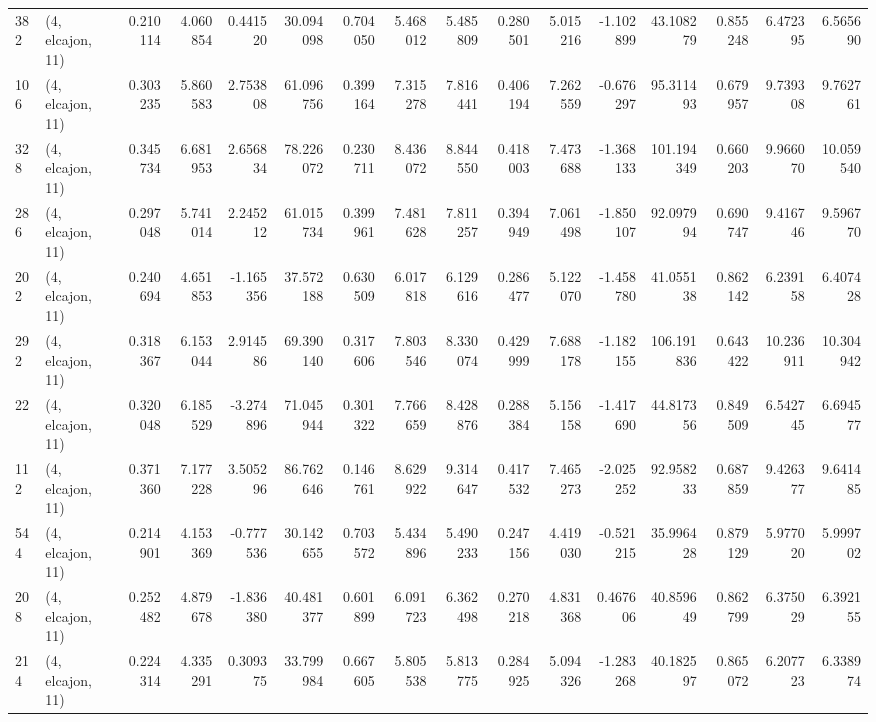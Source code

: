 \begin{tabular}{llrrrrrrrrrrrrrr}
382 &  (4, elcajon, 11) &   0.210114 &   4.060854 &   0.441520 &    30.094098 &   0.704050 &   5.468012 &   5.485809 &  0.280501 &   5.015216 &  -1.102899 &    43.108279 &  0.855248 &   6.472395 &   6.565690 \\
106 &  (4, elcajon, 11) &   0.303235 &   5.860583 &   2.753808 &    61.096756 &   0.399164 &   7.315278 &   7.816441 &  0.406194 &   7.262559 &  -0.676297 &    95.311493 &  0.679957 &   9.739308 &   9.762761 \\
328 &  (4, elcajon, 11) &   0.345734 &   6.681953 &   2.656834 &    78.226072 &   0.230711 &   8.436072 &   8.844550 &  0.418003 &   7.473688 &  -1.368133 &   101.194349 &  0.660203 &   9.966070 &  10.059540 \\
286 &  (4, elcajon, 11) &   0.297048 &   5.741014 &   2.245212 &    61.015734 &   0.399961 &   7.481628 &   7.811257 &  0.394949 &   7.061498 &  -1.850107 &    92.097994 &  0.690747 &   9.416746 &   9.596770 \\
202 &  (4, elcajon, 11) &   0.240694 &   4.651853 &  -1.165356 &    37.572188 &   0.630509 &   6.017818 &   6.129616 &  0.286477 &   5.122070 &  -1.458780 &    41.055138 &  0.862142 &   6.239158 &   6.407428 \\
292 &  (4, elcajon, 11) &   0.318367 &   6.153044 &   2.914586 &    69.390140 &   0.317606 &   7.803546 &   8.330074 &  0.429999 &   7.688178 &  -1.182155 &   106.191836 &  0.643422 &  10.236911 &  10.304942 \\
22  &  (4, elcajon, 11) &   0.320048 &   6.185529 &  -3.274896 &    71.045944 &   0.301322 &   7.766659 &   8.428876 &  0.288384 &   5.156158 &  -1.417690 &    44.817356 &  0.849509 &   6.542745 &   6.694577 \\
112 &  (4, elcajon, 11) &   0.371360 &   7.177228 &   3.505296 &    86.762646 &   0.146761 &   8.629922 &   9.314647 &  0.417532 &   7.465273 &  -2.025252 &    92.958233 &  0.687859 &   9.426377 &   9.641485 \\
544 &  (4, elcajon, 11) &   0.214901 &   4.153369 &  -0.777536 &    30.142655 &   0.703572 &   5.434896 &   5.490233 &  0.247156 &   4.419030 &  -0.521215 &    35.996428 &  0.879129 &   5.977020 &   5.999702 \\
208 &  (4, elcajon, 11) &   0.252482 &   4.879678 &  -1.836380 &    40.481377 &   0.601899 &   6.091723 &   6.362498 &  0.270218 &   4.831368 &   0.467606 &    40.859649 &  0.862799 &   6.375029 &   6.392155 \\
214 &  (4, elcajon, 11) &   0.224314 &   4.335291 &   0.309375 &    33.799984 &   0.667605 &   5.805538 &   5.813775 &  0.284925 &   5.094326 &  -1.283268 &    40.182597 &  0.865072 &   6.207723 &   6.338974 \\

\end{tabular}
